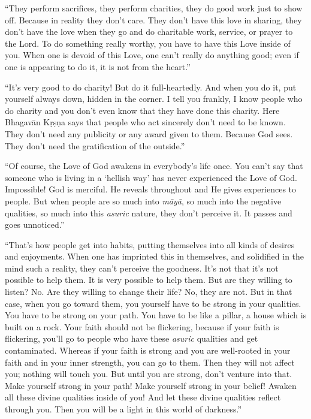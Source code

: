 \enquote{They perform sacrifices, they perform charities, they do good work just to show off. Because in reality they don’t care. They don’t have this love in sharing, they don’t have the love when they go and do charitable work, service, or prayer to the Lord. To do something really worthy, you have to have this Love inside of you. When one is devoid of this Love, one can’t really do anything good; even if one is appearing to do it, it is not from the heart.}

\enquote{It’s very good to do charity! But do it full-heartedly. And when you do it, put yourself always down, hidden in the corner. I tell you frankly, I know people who do charity and you don’t even know that they have done this charity. Here Bhagavān Kṛṣṇa says that people who act sincerely don’t need to be known. They don’t need any publicity or any award given to them. Because God sees. They don’t need the gratification of the outside.}

\enquote{Of course, the Love of God awakens in everybody’s life once. You can’t say that someone who is living in a \enquote{hellish way} has never experienced the Love of God. Impossible! God is merciful. He reveals throughout and He gives experiences to people. But when people are so much into \textit{māyā}, so much into the negative qualities, so much into this \textit{asuric} nature, they don’t perceive it. It passes and goes unnoticed.}

\enquote{That’s how people get into habits, putting themselves into all kinds of desires and enjoyments. When one has imprinted this in themselves, and solidified in the mind such a reality, they can’t perceive the goodness. It’s not that it’s not possible to help them. It is very possible to help them. But are they willing to listen? No. Are they willing to change their life? No, they are not. But in that case, when you go toward them, you yourself have to be strong in your qualities. You have to be strong on your path. You have to be like a pillar, a house which is built on a rock. Your faith should not be flickering, because if your faith is flickering, you’ll go to people who have these \textit{asuric} qualities and get contaminated. Whereas if your faith is strong and you are well-rooted in your faith and in your inner strength, you can go to them. Then they will not affect you; nothing will touch you. But until you are strong, don’t venture into that. Make yourself strong in your path! Make yourself strong in your belief! Awaken all these divine qualities inside of you! And let these divine qualities reflect through you. Then you will be a light in this world of darkness.}

